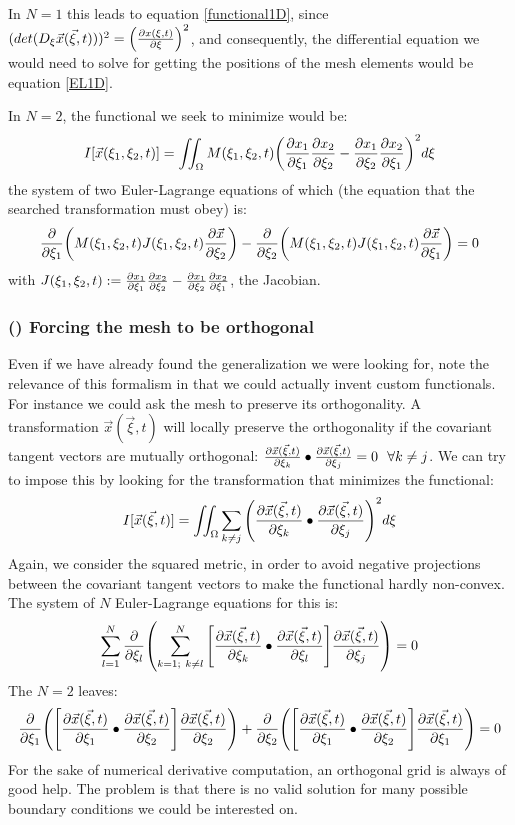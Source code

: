 \documentclass[11pt, a4paper]{article} %
\begin{document}
In $N=1$ this leads to equation \eqref{functional1D}, since $(det(D_\xi \vec{x}(\vec{\xi},t)))^2=\qty(\pdv{x(\xi,t)}{\xi})^2$, and consequently, the differential equation we would need to solve for getting the positions of the mesh elements would be equation \eqref{EL1D}.

In $N=2$, the functional we seek to minimize would be:
\begin{equation}
I[\vec{x}(\xi_1,\xi_2 ,t)]=\iint_\Omega M(\xi_1, \xi_2,t) \qty( \pdv{x_1}{\xi_1}\pdv{x_2}{\xi_2} - \pdv{x_1}{\xi_2} \pdv{x_2}{\xi_1})^2 d\xi
\end{equation}
the system of two Euler-Lagrange equations of which (the equation that the searched transformation must obey) is:
\begin{equation}
\pdv{}{\xi_1}\qty(M(\xi_1,\xi_2,t)J(\xi_1,\xi_2,t)\pdv{\vec{x}}{\xi_2})-\pdv{}{\xi_2}\qty(M(\xi_1,\xi_2,t)J(\xi_1,\xi_2,t)\pdv{\vec{x}}{\xi_1})=0
\end{equation}
with $J(\xi_1,\xi_2,t):=\pdv{x_1}{\xi_1}\pdv{x_2}{\xi_2} - \pdv{x_1}{\xi_2} \pdv{x_2}{\xi_1}$, the Jacobian.

\subsubsection*{\bf (\textgamma) Forcing the mesh to be orthogonal}
Even if we have already found the generalization we were looking for, note the relevance of this formalism in that we could actually invent custom functionals. For instance we could ask the mesh to preserve its orthogonality. A transformation $\vec{x}(\vec{\xi},t)$ will locally preserve the orthogonality if the covariant tangent vectors are mutually orthogonal: $\pdv{\vec{x}(\vec{\xi},t)}{\xi_k}\bullet \pdv{\vec{x}(\vec{\xi},t)}{\xi_j}=0\ \ \forall k\neq j$. We can try to impose this by looking for the transformation that minimizes the functional:
\begin{equation}
I[\vec{x}(\vec{\xi},t)]=\iint_\Omega \sum_{k\neq j} \qty(\pdv{\vec{x}(\vec{\xi},t)}{\xi_k}\bullet \pdv{\vec{x}(\vec{\xi},t)}{\xi_j})^2 d\xi
\end{equation}
Again, we consider the squared metric, in order to avoid negative projections between the covariant tangent vectors to make the functional hardly non-convex.
The system of $N$ Euler-Lagrange equations for this is:
\begin{equation}
\sum_{l=1}^N \pdv{}{\xi_l}\qty( \sum_{k=1;\ k\neq l}^N \qty[\pdv{\vec{x}(\vec{\xi},t)}{\xi_k}\bullet \pdv{\vec{x}(\vec{\xi},t)}{\xi_l}] \pdv{\vec{x}(\vec{\xi},t)}{\xi_j}  )=0
\end{equation}
The $N=2$ leaves:
\begin{equation}
\pdv{}{\xi_1}\qty( \qty[\pdv{\vec{x}(\vec{\xi},t)}{\xi_1}\bullet \pdv{\vec{x}(\vec{\xi},t)}{\xi_2}] \pdv{\vec{x}(\vec{\xi},t)}{\xi_2}  )+\pdv{}{\xi_2}\qty( \qty[\pdv{\vec{x}(\vec{\xi},t)}{\xi_1}\bullet \pdv{\vec{x}(\vec{\xi},t)}{\xi_2}] \pdv{\vec{x}(\vec{\xi},t)}{\xi_1}  )=0
\end{equation}
For the sake of numerical derivative computation, an orthogonal grid is always of good help. The problem is that there is no valid solution for many possible boundary conditions we could be interested on.
\end{document}
